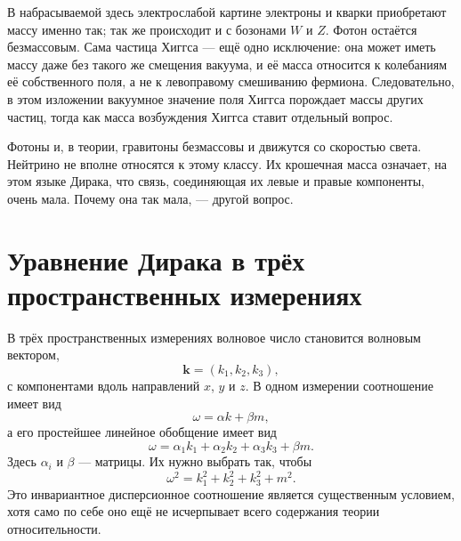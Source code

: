 В набрасываемой здесь электрослабой картине электроны и кварки приобретают массу именно так; так же происходит и с бозонами \(W\) и \(Z\). Фотон остаётся безмассовым. Сама частица Хиггса — ещё одно исключение: она может иметь массу даже без такого же смещения вакуума, и её масса относится к колебаниям её собственного поля, а не к левоправому смешиванию фермиона. Следовательно, в этом изложении вакуумное значение поля Хиггса порождает массы других частиц, тогда как масса возбуждения Хиггса ставит отдельный вопрос.

\begin{classroomqa}
\end{classroomqa}

Фотоны и, в теории, гравитоны безмассовы и движутся со скоростью света. Нейтрино не вполне относятся к этому классу. Их крошечная масса означает, на этом языке Дирака, что связь, соединяющая их левые и правые компоненты, очень мала. Почему она так мала, — другой вопрос.

\section{Уравнение Дирака в трёх пространственных измерениях}

В трёх пространственных измерениях волновое число становится волновым вектором,
\begin{equation}
\mathbf{k}=(k_1,k_2,k_3),
\end{equation}
с компонентами вдоль направлений \(x\), \(y\) и \(z\). В одном измерении соотношение имеет вид
\begin{equation}
\omega=\alpha k+\beta m,
\end{equation}
а его простейшее линейное обобщение имеет вид
\begin{equation}
\omega
=
\alpha_1 k_1+\alpha_2 k_2+\alpha_3 k_3+\beta m.
\end{equation}
Здесь \(\alpha_i\) и \(\beta\) — матрицы. Их нужно выбрать так, чтобы
\begin{equation}
\omega^2=k_1^2+k_2^2+k_3^2+m^2.
\end{equation}
Это инвариантное дисперсионное соотношение является существенным условием, хотя само по себе оно ещё не исчерпывает всего содержания теории относительности.

